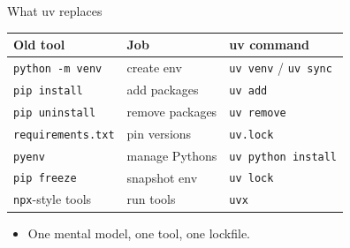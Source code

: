 \documentclass[aspectratio=169]{beamer}
\begin{document}
\begin{frame}{What uv replaces}
  \begin{table}
    \small
    \begin{tabular}{@{}lll@{}}
      \toprule
      Old tool & Job & uv command \\
      \midrule
      \texttt{python -m venv} & create env & \texttt{uv venv} / \texttt{uv sync} \\
      \texttt{pip install} & add packages & \texttt{uv add} \\
      \texttt{pip uninstall} & remove packages & \texttt{uv remove} \\
      \texttt{requirements.txt} & pin versions & \texttt{uv.lock} \\
      \texttt{pyenv} & manage Pythons & \texttt{uv python install} \\
      \texttt{pip freeze} & snapshot env & \texttt{uv lock} \\
      \texttt{npx}-style tools & run tools & \texttt{uvx} \\
      \bottomrule
    \end{tabular}
  \end{table}
  \vspace{0.3cm}
  \begin{itemize}
    \item One mental model, one tool, one lockfile.
  \end{itemize}
\end{frame}
\end{document}
